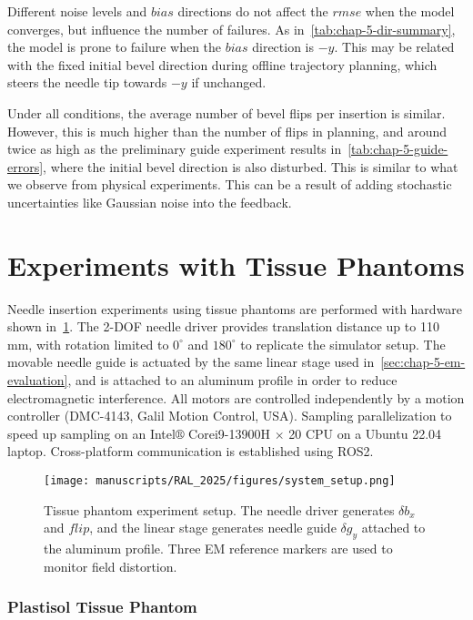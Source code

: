 Different noise levels and $bias$ directions do not affect the $rmse$ when the model converges, but influence the number of failures. As in~\cref{tab:chap-5-dir-summary}, the model is prone to failure when the $bias$ direction is $-y$. This may be related with the fixed initial bevel direction during offline trajectory planning, which steers the needle tip towards $-y$ if unchanged.

Under all conditions, the average number of bevel flips per insertion is similar. However, this is much higher than the number of flips in planning, and around twice as high as the preliminary guide experiment results in~\cref{tab:chap-5-guide-errors}, where the initial bevel direction is also disturbed. This is similar to what we observe from physical experiments. This can be a result of adding stochastic uncertainties like Gaussian noise into the feedback.

\section{Experiments with Tissue Phantoms}
\label{sec:chap-5-phantom-experiment}

Needle insertion experiments using tissue phantoms are performed with hardware shown in~\cref{fig:chap-5-setup}. The 2-DOF needle driver provides translation distance up to 110 mm, with rotation limited to $0^{\circ}$ and $180^{\circ}$ to replicate the simulator setup. The movable needle guide is actuated by the same linear stage used in~\cref{sec:chap-5-em-evaluation}, and is attached to an aluminum profile in order to reduce electromagnetic interference. All motors are controlled independently by a motion controller (DMC-4143, Galil Motion Control, USA). Sampling parallelization to speed up sampling on an Intel$\circledR$ Core\texttrademark i9-13900H $\times$ 20 CPU on a Ubuntu 22.04 laptop. Cross-platform communication is established using ROS2.

\begin{figure}[h]
  \centering
  \texttt{[image: manuscripts/RAL\_2025/figures/system\_setup.png]}
  \caption{Tissue phantom experiment setup. The needle driver generates $\delta b_x$ and $flip$, and the linear stage generates needle guide $\delta g_y$ attached to the aluminum profile. Three EM reference markers are used to monitor field distortion.}
  \label{fig:chap-5-setup}
\end{figure}

\subsubsection{Plastisol Tissue Phantom}
\label{sec:chap-5-plastisol}

